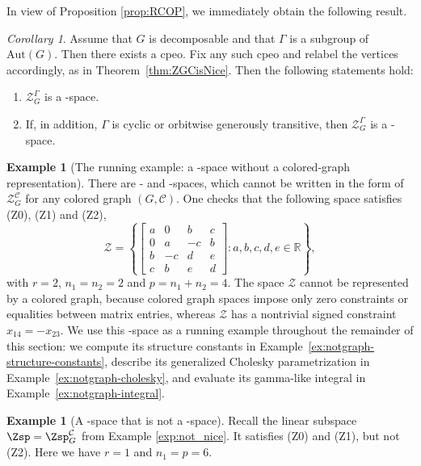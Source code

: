 \documentclass[12pt]{amsart}
\theoremstyle{plain}
\theoremstyle{definition}
\newtheorem{example}[theorem]{Example}
\theoremstyle{remark}
\newtheorem{corol}[theorem]{Corollary}
\newcommand{\R}{\mathbb{R}}
\newcommand{\1}{\mathbf{1}}
\begin{document}
In view of Proposition \ref{prop:RCOP}, we immediately obtain the following result. 
\begin{corol}
Assume that $G$ is decomposable and that $\Gamma$ is a subgroup of
$\mathrm{Aut}(G)$. Then there exists a cpeo. Fix any such cpeo and
relabel the vertices accordingly, as in
Theorem~\ref{thm:ZGCisNice}. Then the following statements hold:
\begin{enumerate}
    \item[(i)] $\mathcal{Z}_G^\Gamma$ is a \BC-space.
    \item[(ii)] If, in addition, $\Gamma$ is cyclic or orbitwise generously transitive, then $\mathcal{Z}_G^\Gamma$ is a \cBC-space.
\end{enumerate}
\end{corol}


\begin{example}[The running example: a \cBC-space without a colored-graph representation]\label{ex:notgraph} There are \BC- and \cBC-spaces, which cannot be written in the form of $\mathcal{Z}_G^{\mathcal{C}}$ for any colored graph $(G,\mathcal{C})$. 
One checks that the following space satisfies (Z0), (Z1) and (Z2),
\[
\mathcal{Z} =
\left\{
\left[
\begin{array}{cc|cc}
 a & 0 & b & c \\ 
0 & a & -c & b \\
\hline
b & -c & d & e \\
c & b & e & d 
\end{array}
\right]\colon 
a, b,c,d,e \in \R\right\},
\]
with $r=2$, $n_1 = n_2 = 2$ and $p=n_1+n_2=4$. The space \(\mathcal Z\) cannot be represented by a colored graph, because colored graph spaces impose only zero constraints or equalities between matrix entries, whereas \(\mathcal Z\) has a nontrivial signed constraint \(x_{14}=-x_{23}\).
We use this \cBC-space as a running example throughout the remainder of
this section: we compute its structure constants in
Example~\ref{ex:notgraph-structure-constants}, describe its generalized
Cholesky parametrization in Example~\ref{ex:notgraph-cholesky}, and
evaluate its gamma-like integral in Example~\ref{ex:notgraph-integral}.
\end{example}


\begin{example}[A \BC-space that is not a \cBC-space]\label{ex:Z1}
Recall the linear subspace $\Zsp= \Zsp_{G}^{\mathcal{C}}$
    from Example \ref{exp:not_nice}. 
It satisfies (Z0) and (Z1), but not (Z2).
Here we have $r = 1$ and $n_1 = p = 6$.
\end{example}
\end{document}
